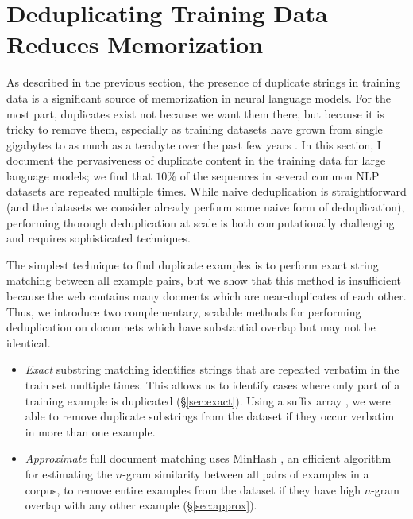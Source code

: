 \section{Deduplicating Training Data Reduces Memorization}
\label{section:dedup}

As described in the previous section, the presence of duplicate strings in training data is a significant source of memorization in neural language models.
For the most part, duplicates exist not because we want them there, but because it is tricky to remove them, especially as training datasets have grown from single gigabytes to as much as a terabyte over the past few years \citep{chelba2013one,xue2020mt5,graff2003english,brown2020language}.
In this section, I document the pervasiveness of duplicate content in the training data for large language models; we find that $10\%$ of the sequences in several common NLP datasets are repeated multiple times.
While naive deduplication is straightforward
(and the datasets we consider already perform some naive form
of deduplication), performing thorough deduplication at scale is both computationally challenging and requires sophisticated techniques.




The simplest technique to find duplicate examples is to perform exact string matching between all example pairs, but we show that this method is insufficient because the web contains many docments which are near-duplicates of each other.
Thus, we introduce two complementary, scalable methods for performing deduplication on documnets which have substantial overlap but may not be identical.
\begin{itemize}
    \item
\textit{Exact} substring matching identifies strings that are repeated verbatim in the train set multiple times.
This allows us to identify cases where only part of a training example is duplicated (\S\ref{sec:exact}).
Using a suffix array \cite{manber1993suffix}, we were able to remove duplicate substrings from the dataset if they occur verbatim in more than one example.
    \item
\textit{Approximate} full document matching uses  MinHash \citep{broder1997resemblance}, an efficient algorithm for estimating the $n$-gram similarity between all pairs of examples in a corpus, to remove entire examples from the dataset if they have high $n$-gram overlap with any other example (\S\ref{sec:approx}).
\end{itemize}

